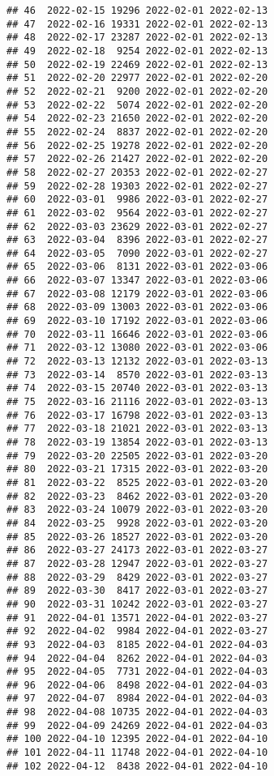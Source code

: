 \documentclass[
]{article}
\begin{document}
\begin{verbatim}
## 46  2022-02-15 19296 2022-02-01 2022-02-13
## 47  2022-02-16 19331 2022-02-01 2022-02-13
## 48  2022-02-17 23287 2022-02-01 2022-02-13
## 49  2022-02-18  9254 2022-02-01 2022-02-13
## 50  2022-02-19 22469 2022-02-01 2022-02-13
## 51  2022-02-20 22977 2022-02-01 2022-02-20
## 52  2022-02-21  9200 2022-02-01 2022-02-20
## 53  2022-02-22  5074 2022-02-01 2022-02-20
## 54  2022-02-23 21650 2022-02-01 2022-02-20
## 55  2022-02-24  8837 2022-02-01 2022-02-20
## 56  2022-02-25 19278 2022-02-01 2022-02-20
## 57  2022-02-26 21427 2022-02-01 2022-02-20
## 58  2022-02-27 20353 2022-02-01 2022-02-27
## 59  2022-02-28 19303 2022-02-01 2022-02-27
## 60  2022-03-01  9986 2022-03-01 2022-02-27
## 61  2022-03-02  9564 2022-03-01 2022-02-27
## 62  2022-03-03 23629 2022-03-01 2022-02-27
## 63  2022-03-04  8396 2022-03-01 2022-02-27
## 64  2022-03-05  7090 2022-03-01 2022-02-27
## 65  2022-03-06  8131 2022-03-01 2022-03-06
## 66  2022-03-07 13347 2022-03-01 2022-03-06
## 67  2022-03-08 12179 2022-03-01 2022-03-06
## 68  2022-03-09 13003 2022-03-01 2022-03-06
## 69  2022-03-10 17192 2022-03-01 2022-03-06
## 70  2022-03-11 16646 2022-03-01 2022-03-06
## 71  2022-03-12 13080 2022-03-01 2022-03-06
## 72  2022-03-13 12132 2022-03-01 2022-03-13
## 73  2022-03-14  8570 2022-03-01 2022-03-13
## 74  2022-03-15 20740 2022-03-01 2022-03-13
## 75  2022-03-16 21116 2022-03-01 2022-03-13
## 76  2022-03-17 16798 2022-03-01 2022-03-13
## 77  2022-03-18 21021 2022-03-01 2022-03-13
## 78  2022-03-19 13854 2022-03-01 2022-03-13
## 79  2022-03-20 22505 2022-03-01 2022-03-20
## 80  2022-03-21 17315 2022-03-01 2022-03-20
## 81  2022-03-22  8525 2022-03-01 2022-03-20
## 82  2022-03-23  8462 2022-03-01 2022-03-20
## 83  2022-03-24 10079 2022-03-01 2022-03-20
## 84  2022-03-25  9928 2022-03-01 2022-03-20
## 85  2022-03-26 18527 2022-03-01 2022-03-20
## 86  2022-03-27 24173 2022-03-01 2022-03-27
## 87  2022-03-28 12947 2022-03-01 2022-03-27
## 88  2022-03-29  8429 2022-03-01 2022-03-27
## 89  2022-03-30  8417 2022-03-01 2022-03-27
## 90  2022-03-31 10242 2022-03-01 2022-03-27
## 91  2022-04-01 13571 2022-04-01 2022-03-27
## 92  2022-04-02  9984 2022-04-01 2022-03-27
## 93  2022-04-03  8185 2022-04-01 2022-04-03
## 94  2022-04-04  8262 2022-04-01 2022-04-03
## 95  2022-04-05  7731 2022-04-01 2022-04-03
## 96  2022-04-06  8498 2022-04-01 2022-04-03
## 97  2022-04-07  8984 2022-04-01 2022-04-03
## 98  2022-04-08 10735 2022-04-01 2022-04-03
## 99  2022-04-09 24269 2022-04-01 2022-04-03
## 100 2022-04-10 12395 2022-04-01 2022-04-10
## 101 2022-04-11 11748 2022-04-01 2022-04-10
## 102 2022-04-12  8438 2022-04-01 2022-04-10

\end{verbatim}
\end{document}
